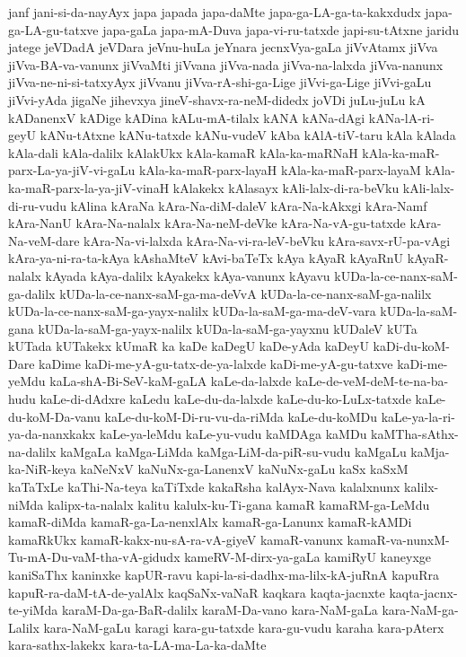 {janf
jani-si-da-nayAyx
japa
japada
japa-daMte
japa-ga-LA-ga-ta-kakxdudx
japa-ga-LA-gu-tatxve
japa-gaLa
japa-mA-Duva
japa-vi-ru-tatxde
japi-su-tAtxne
jaridu
jatege
jeVDadA
jeVDara
jeVnu-huLa
jeYnara
jecnxVya-gaLa
jiVvAtamx
jiVva
jiVva-BA-va-vanunx
jiVvaMti
jiVvana
jiVva-nada
jiVva-na-lalxda
jiVva-nanunx
jiVva-ne-ni-si-tatxyAyx
jiVvanu
jiVva-rA-shi-ga-Lige
jiVvi-ga-Lige
jiVvi-gaLu
jiVvi-yAda
jigaNe
jihevxya
jineV-shavx-ra-neM-didedx
joVDi
juLu-juLu
kA
kADanenxV
kADige
kADina
kALu-mA-tilalx
kANA
kANa-dAgi
kANa-lA-ri-geyU
kANu-tAtxne
kANu-tatxde
kANu-vudeV
kAba
kAlA-tiV-taru
kAla
kAlada
kAla-dali
kAla-dalilx
kAlakUkx
kAla-kamaR
kAla-ka-maRNaH
kAla-ka-maR-parx-La-ya-jiV-vi-gaLu
kAla-ka-maR-parx-layaH
kAla-ka-maR-parx-layaM
kAla-ka-maR-parx-la-ya-jiV-vinaH
kAlakekx
kAlasayx
kAli-lalx-di-ra-beVku
kAli-lalx-di-ru-vudu
kAlina
kAraNa
kAra-Na-diM-daleV
kAra-Na-kAkxgi
kAra-Namf
kAra-NanU
kAra-Na-nalalx
kAra-Na-neM-deVke
kAra-Na-vA-gu-tatxde
kAra-Na-veM-dare
kAra-Na-vi-lalxda
kAra-Na-vi-ra-leV-beVku
kAra-savx-rU-pa-vAgi
kAra-ya-ni-ra-ta-kAya
kAshaMteV
kAvi-baTeTx
kAya
kAyaR
kAyaRnU
kAyaR-nalalx
kAyada
kAya-dalilx
kAyakekx
kAya-vanunx
kAyavu
kUDa-la-ce-nanx-saM-ga-dalilx
kUDa-la-ce-nanx-saM-ga-ma-deVvA
kUDa-la-ce-nanx-saM-ga-nalilx
kUDa-la-ce-nanx-saM-ga-yayx-nalilx
kUDa-la-saM-ga-ma-deV-vara
kUDa-la-saM-gana
kUDa-la-saM-ga-yayx-nalilx
kUDa-la-saM-ga-yayxnu
kUDaleV
kUTa
kUTada
kUTakekx
kUmaR
ka
kaDe
kaDegU
kaDe-yAda
kaDeyU
kaDi-du-koM-Dare
kaDime
kaDi-me-yA-gu-tatx-de-ya-lalxde
kaDi-me-yA-gu-tatxve
kaDi-me-yeMdu
kaLa-shA-Bi-SeV-kaM-gaLA
kaLe-da-lalxde
kaLe-de-veM-deM-te-na-ba-hudu
kaLe-di-dAdxre
kaLedu
kaLe-du-da-lalxde
kaLe-du-ko-LuLx-tatxde
kaLe-du-koM-Da-vanu
kaLe-du-koM-Di-ru-vu-da-riMda
kaLe-du-koMDu
kaLe-ya-la-ri-ya-da-nanxkakx
kaLe-ya-leMdu
kaLe-yu-vudu
kaMDAga
kaMDu
kaMTha-sAthx-na-dalilx
kaMgaLa
kaMga-LiMda
kaMga-LiM-da-piR-su-vudu
kaMgaLu
kaMja-ka-NiR-keya
kaNeNxV
kaNuNx-ga-LanenxV
kaNuNx-gaLu
kaSx
kaSxM
kaTaTxLe
kaThi-Na-teya
kaTiTxde
kakaRsha
kalAyx-Nava
kalalxnunx
kalilx-niMda
kalipx-ta-nalalx
kalitu
kalulx-ku-Ti-gana
kamaR
kamaRM-ga-LeMdu
kamaR-diMda
kamaR-ga-La-nenxlAlx
kamaR-ga-Lanunx
kamaR-kAMDi
kamaRkUkx
kamaR-kakx-nu-sA-ra-vA-giyeV
kamaR-vanunx
kamaR-va-nunxM-Tu-mA-Du-vaM-tha-vA-gidudx
kameRV-M-dirx-ya-gaLa
kamiRyU
kaneyxge
kaniSaThx
kaninxke
kapUR-ravu
kapi-la-si-dadhx-ma-lilx-kA-juRnA
kapuRra
kapuR-ra-daM-tA-de-yalAlx
kaqSaNx-vaNaR
kaqkara
kaqta-jacnxte
kaqta-jacnx-te-yiMda
karaM-Da-ga-BaR-dalilx
karaM-Da-vano
kara-NaM-gaLa
kara-NaM-ga-Lalilx
kara-NaM-gaLu
karagi
kara-gu-tatxde
kara-gu-vudu
karaha
kara-pAterx
kara-sathx-lakekx
kara-ta-LA-ma-La-ka-daMte
}
